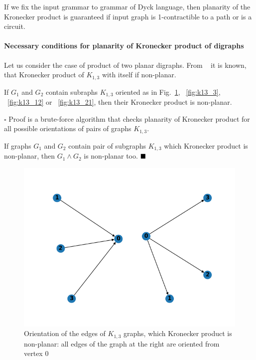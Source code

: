 \begin{corollary}
If we fix the input grammar to grammar of Dyck language, then planarity of the Kronecker product is guaranteed if input graph is 1-contractible to a path or is a circuit.
\end{corollary}

\paragraph{Necessary conditions for planarity of Kronecker product of digraphs}

Let us consider the case of product of two planar digraphs. From ~\citep{farzan1977kronecker} it is known, that Kronecker product of $K_{1, 3}$ with itself if non-planar.

\begin{proposition}
If $G_1$ and $G_2$ contain subraphs $K_{1, 3}$ oriented as in Fig.~\ref{fig:k13_0}, ~\ref{fig:k13_3}, ~\ref{fig:k13_12} or ~\ref{fig:k13_21}, then their Kronecker product is non-planar. 
\end{proposition}

$\square$
Proof is a brute-force algorithm that checks planarity of Kronecker product for all possible orientations of pairs of graphs $K_{1, 3}$.

If graphs $G_1$ and $G_2$ contain pair of subgraphs $K_{1, 3}$ which Kronecker product is non-planar, then $G_1 \wedge G_2$ is non-planar too.
$\hfill\blacksquare$

\begin{figure}[h]

  \begin{center}  
  \includegraphics[scale = 0.3]{k13_0.png}
  \end{center}

  \caption{Orientation of the edges of $K_{1, 3}$ graphs, which Kronecker product is non-planar: all edges of the graph at the right are oriented from vertex $0$}

  \label{fig:k13_0}

\end{figure}


